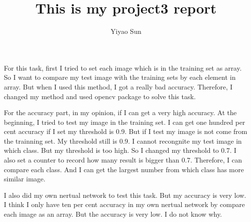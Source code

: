 \documentclass[12pt]{report}
\begin{document}
\author{Yiyao Sun}
\title{This is my project3 report}
\maketitle
\LARGE

For this task, first I tried to set each image which is in the training set as array. So I want to compare my test image with the training sets by each element in array. But when I used this method, I got a really bad accuracy. Therefore, I changed my method and used opencv package to solve this task. 
\begin{center}
	
\end{center}
For the accuracy part,
in my opinion, if I can get a very high accuracy. At the beginning, I tried 
to test my image in the training set. I can get one hundred per cent accuracy if I set my threshold is 0.9. But if I test my image is not come from the trainning set. My threshold still is 0.9. I cannot recongnite my test image in which class. But my threshold is too high. So I changed my threshold to 0.7. I also set a counter to record how many result is bigger than 0.7. Therefore, I can compare each class. And I can get the largest number from which class has more similar image.

I also did my own nertual network to test this task. But my accuracy is very low. I think I only have ten per cent accuracy in my own nertual network by compare each image as an array. But the accuracy is very low. I do not know why.  
\end{document}
